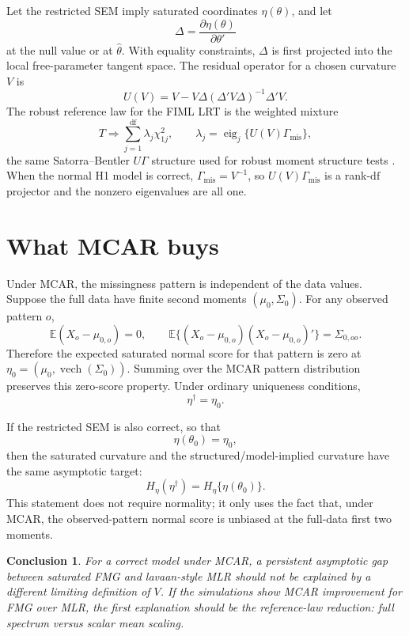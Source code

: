 \documentclass[11pt]{article}
\newcommand{\E}{\mathbb{E}}
\newcommand{\vech}{\operatorname{vech}}
\newcommand{\eig}{\operatorname{eig}}
\newtheorem*{conclusion}{Conclusion}
\begin{document}
Let the restricted SEM imply saturated coordinates \(\eta(\theta)\), and let
\[
  \Delta
    =
  \frac{\partial \eta(\theta)}{\partial\theta'}
\]
at the null value or at \(\hat\theta\). With equality constraints, \(\Delta\)
is first projected into the local free-parameter tangent space. The residual
operator for a chosen curvature \(V\) is
\[
  U(V)
    =
  V - V\Delta(\Delta'V\Delta)^{-1}\Delta'V.
\]
The robust reference law for the FIML LRT is the weighted mixture
\[
  T
    \Rightarrow
  \sum_{j=1}^{\mathrm{df}} \lambda_j \chi^2_{1j},
  \qquad
  \lambda_j
    =
  \eig_j\{U(V)\Gamma_{\mathrm{mis}}\},
\]
the same Satorra--Bentler \(U\Gamma\) structure used for robust moment
structure tests \cite{satorrabentler1994,satorra2000}. When the normal H1
model is correct, \(\Gamma_{\mathrm{mis}}=V^{-1}\), so
\(U(V)\Gamma_{\mathrm{mis}}\) is a rank-\(\mathrm{df}\) projector and the
nonzero eigenvalues are all one.

\section*{What MCAR buys}

Under MCAR, the missingness pattern is independent of the data values. Suppose
the full data have finite second moments \((\mu_0,\Sigma_0)\). For any
observed pattern \(o\),
\[
  \E(X_o-\mu_{0,o}) = 0,
  \qquad
  \E\{(X_o-\mu_{0,o})(X_o-\mu_{0,o})'\} = \Sigma_{0,oo}.
\]
Therefore the expected saturated normal score for that pattern is zero at
\(\eta_0=(\mu_0,\vech(\Sigma_0))\). Summing over the MCAR pattern
distribution preserves this zero-score property. Under ordinary uniqueness
conditions,
\[
  \eta^\dagger = \eta_0.
\]

If the restricted SEM is also correct, so that
\[
  \eta(\theta_0)=\eta_0,
\]
then the saturated curvature and the structured/model-implied curvature have
the same asymptotic target:
\[
  H_\eta(\eta^\dagger)
    =
  H_\eta\{\eta(\theta_0)\}.
\]
This statement does not require normality; it only uses the fact that, under
MCAR, the observed-pattern normal score is unbiased at the full-data first two
moments.

\begin{conclusion}
For a correct model under MCAR, a persistent asymptotic gap between saturated
FMG and lavaan-style MLR should not be explained by a different limiting
definition of \(V\). If the simulations show MCAR improvement for FMG over MLR,
the first explanation should be the reference-law reduction: full spectrum
versus scalar mean scaling.
\end{conclusion}
\end{document}
